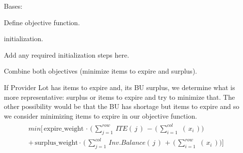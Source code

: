 \documentclass[letterpaper,10pt,english]{sphinxmanual}
\begin{document}
\begin{fulllineitems}
\label{\detokenize{source/optimization.model:optimization.model.optimizer.ObjectiveFunction}}
Bases: 

Define objective function.

\begin{fulllineitems}
\label{\detokenize{source/optimization.model:optimization.model.optimizer.ObjectiveFunction.__init__}}
  initialization.

Add any required initialization steps here.

\end{fulllineitems}


\begin{fulllineitems}
\label{\detokenize{source/optimization.model:optimization.model.optimizer.ObjectiveFunction._combined_objective}}
Combine both objectives (minimize items to expire and surplus).

If Provider Lot has items to expire and, its BU surplus, we determine what is more
representative: surplus or items to expire and try to minimize that. The other possibility
would be that the BU has shortage but items to expire and so we consider minimizing items
to expire in our objective function.
\begin{align*}\!\begin{aligned}
min \bigg [ \, \text{expire_weight} \, \cdot \, \bigg (\, \sum_{j=1}^{row}\,ITE(\,j\,)\,-\,(\,\sum_{i=1}^{col}\,\, (\,x_i\,) \bigg )\\
+ \, \text{surplus_weight} \cdot \, \bigg ( \, \sum_{j=1}^{col}\,Inv. Balance(\,j\,)\,+ \,(\,\sum_{i=1}^{row}\,\,  (\,x_i\,) \bigg ) \bigg ]\\
\end{aligned}\end{align*}
\end{fulllineitems}


\end{fulllineitems}
\end{document}
